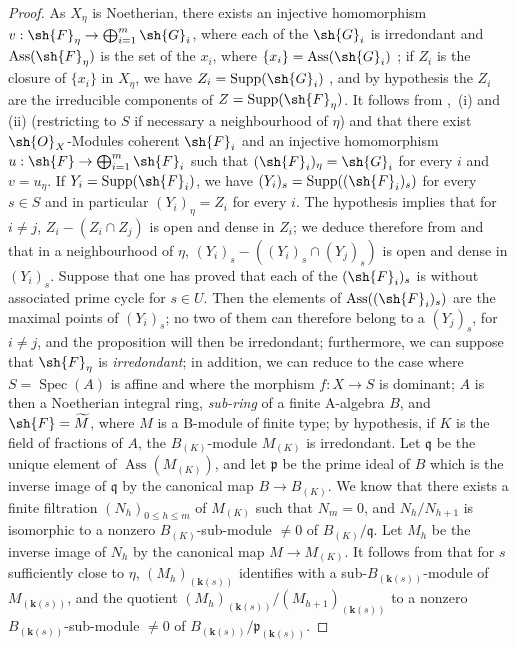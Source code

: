 \begin{proof}
As $X_\eta$ is Noetherian, there exists an injective homomorphism $v:\sh{F}_\eta\to\bigoplus_{i=1}^m\sh{G}_i$, where each of the $\sh{G}_i$ is irredondant and $\operatorname{Ass}(\sh{F}_\eta)$ is the set of the $x_i$, where $\{x_i\}=\operatorname{Ass}(\sh{G}_i)$ ; if $Z_i$ is the closure of $\{x_i\}$ in $X_\eta$, we have $Z_i=\operatorname{Supp}(\sh{G}_i)$ , and by hypothesis the $Z_i$ are the irreducible components of $Z=\operatorname{Supp}(\sh{F}_\eta)$.
It follows from ,~(i) and (ii) (restricting to $S$ if necessary a neighbourhood of $\eta$) and  that there exist $\sh{O}_X$-Modules coherent $\sh{F}_i$ and an injective homomorphism $u:\sh{F}\to\bigoplus_{i=1}^m\sh{F}_i$ such that $(\sh{F}_i)_\eta=\sh{G}_i$ for every $i$ and $v=u_\eta$.
If $Y_i=\operatorname{Supp}(\sh{F}_i)$, we have $(Y_i)_s=\operatorname{Supp}((\sh{F}_i)_s)$ for every $s\in S$  and in particular $(Y_i)_\eta=Z_i$ for every $i$.
The hypothesis implies that for $i\neq j$, $Z_i-(Z_i\cap Z_j)$ is open and dense in $Z_i$; we deduce therefore from  and  that in a neighbourhood of $\eta$, $(Y_i)_s-((Y_i)_s\cap(Y_j)_s)$ is open and dense in $(Y_i)_s$.
Suppose that one has proved that each of the $(\sh{F}_i)_s$ is without associated prime cycle for $s\in U$.
Then the elements of $\operatorname{Ass}((\sh{F}_i)_s)$ are the maximal points of $(Y_i)_s$; no two of them can therefore belong to a $(Y_j)_s$, for $i\neq j$, and the proposition will then be irredondant; furthermore, we can suppose that $\sh{F}_\eta$ is \emph{irredondant}; in addition, we can reduce to the case where $S=\operatorname{Spec}(A)$ is affine and where the morphism $f:X\to S$ is dominant; $A$ is then a Noetherian integral ring, \emph{sub-ring} of a finite A-algebra $B$, and $\sh{F}=\widetilde{M}$, where $M$ is a B-module of finite type; by hypothesis, if $K$ is the field of fractions of $A$, the $B_{(K)}$-module $M_{(K)}$ is irredondant.
Let $\mathfrak{q}$ be the unique element of $\operatorname{Ass}(M_{(K)})$, and let $\mathfrak{p}$ be the prime ideal of $B$ which is the inverse image of $\mathfrak{q}$ by the canonical map $B\to B_{(K)}$.
We know  that there exists a finite filtration $(N_h)_{0\leqslant h\leqslant m}$ of $M_{(K)}$ such that $N_m=0$, and $N_h/N_{h+1}$ is isomorphic to a nonzero $B_{(K)}$-sub-module $\neq 0$ of $B_{(K)}/\mathfrak{q}$.
Let $M_h$ be the inverse image of $N_h$ by the canonical map $M\to M_{(K)}$.
It follows from  that for $s$ sufficiently close to $\eta$, $(M_h)_{(\boldsymbol{k}(s))}$ identifies with a sub-$B_{(\boldsymbol{k}(s))}$-module of $M_{(\boldsymbol{k}(s))}$, and the quotient $(M_h)_{(\boldsymbol{k}(s))}/(M_{h+1})_{(\boldsymbol{k}(s))}$ to a nonzero $B_{(\boldsymbol{k}(s))}$-sub-module $\neq 0$ of $B_{(\boldsymbol{k}(s))}/\mathfrak{p}_{(\boldsymbol{k}(s))}$.

\end{proof}
